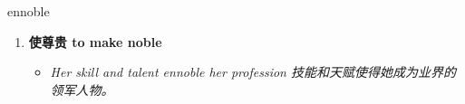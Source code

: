 
\begin{frame}
{\huge ennoble}
\begin{center}
\begin{enumerate}\Large
  \item \textbf{使尊贵 to make noble}
  \begin{itemize}
    \item \em{\Large{Her skill and talent ennoble her profession 技能和天赋使得她成为业界的领军人物。}}
  \end{itemize}
\end{enumerate}
\end{center}
\end{frame}
